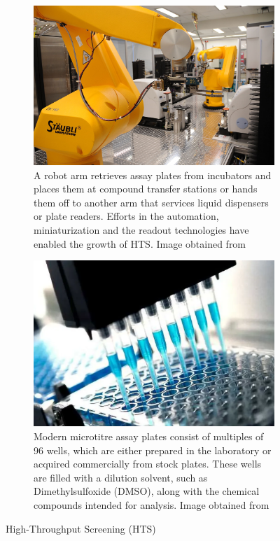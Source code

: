 \begin{figure}[htbp]
    \centering
    \begin{subfigure}[b]{0.48\textwidth}
        \centering
        \includegraphics[width=\textwidth]{figures/hts_robot.png}
        \caption{A robot arm retrieves assay plates from incubators and places them at compound transfer stations or hands them off to another arm that services liquid dispensers or plate readers. Efforts in the automation, miniaturization and the readout technologies have enabled the growth of HTS. Image obtained from~\cite{hts_robot}}
        \label{fig:hts_robot}
    \end{subfigure}
    \hfill
    \begin{subfigure}[b]{0.48\textwidth}
        \centering
        \includegraphics[width=\textwidth]{figures/hts.png}
        \caption{Modern microtitre assay plates consist of multiples of 96 wells, which are either prepared in the laboratory or acquired commercially from stock plates. These wells are filled with a dilution solvent, such as Dimethylsulfoxide (DMSO), along with the chemical compounds intended for analysis. Image obtained from~\cite{hts_plates}}
        \label{fig:hts_plates}
    \end{subfigure}
    \caption{High-Throughput Screening (HTS)}
    \label{fig:hts}
\end{figure}


